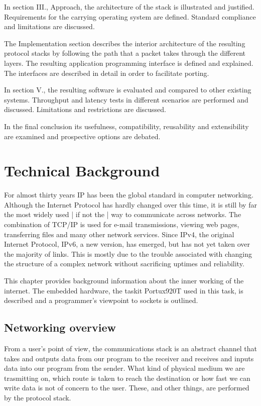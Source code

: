 \documentclass[11pt,twoside,abstract,notitlepage]{scrreprt}
\begin{document}
In section III., Approach, the architecture of the stack is illustrated and justified. Requirements for the carrying operating system are defined. Standard compliance and limitations are discussed.

The Implementation section describes the interior architecture of the resulting protocol stacks by following the path that a packet takes through the different layers. The resulting application programming interface is defined and explained. The interfaces are described in detail in order to facilitate porting.

In section V., the resulting software is evaluated and compared to other existing systems. Throughput and latency tests in different scenarios are performed and discussed. Limitations and restrictions are discussed.

In the final conclusion its usefulness, compatibility, reusability and extensibility are examined and prospective options are debated.

\chapter{Technical Background}
For almost thirty years IP has been the global standard in computer networking. Although the Internet Protocol has hardly changed over this time, it is still by far the most widely used | if not the | way to communicate across networks. The combination of TCP/IP is used for e-mail transmissions, viewing web pages, transferring files and many other network services. Since IPv4, the original Internet Protocol, IPv6, a new version, has emerged, but has not yet taken over the majority of links. This is mostly due to the trouble associated with changing the structure of a complex network without sacrificing uptimes and reliability.

This chapter provides background information about the inner working of the internet. The embedded hardware, the taskit Portux920T used in this task, is described and a programmer's viewpoint to sockets is outlined. 

\section{Networking overview}
From a user's point of view, the communications stack is an abstract channel that takes and outputs data from our program to the receiver and receives and inputs data into our program from the sender. What kind of physical medium we are trasmitting on, which route is taken to reach the destination or how fast we can write data is not of concern to the user. These, and other things, are performed by the protocol stack. 
\end{document}
